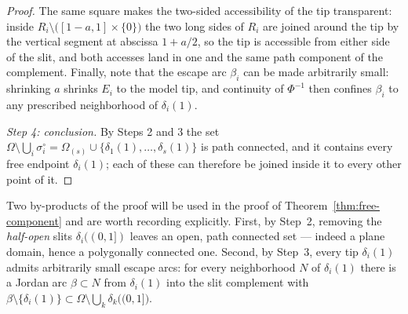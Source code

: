 \begin{proof}
The same square makes the two-sided accessibility of the tip transparent: inside
$R_i\setminus\bigl([1-a,1]\times\{0\}\bigr)$ the two long sides of $R_i$ are joined
around the tip by the vertical segment at abscissa $1+a/2$, so the tip is accessible
from either side of the slit, and both accesses land in one and the same path component
of the complement. Finally, note that the escape arc $\beta_i$ can be made arbitrarily
small: shrinking $a$ shrinks $E_i$ to the model tip, and continuity of $\Phi^{-1}$ then
confines $\beta_i$ to any prescribed neighborhood of $\delta_i(1)$.

\emph{Step 4: conclusion.}
By Steps 2 and 3 the set
$\Omega\setminus\bigcup_i\sigma_i^{\circ}=\Omega_{(s)}\cup\{\delta_1(1),\dots,
\delta_s(1)\}$ is path connected, and it contains every free endpoint $\delta_i(1)$;
each of these can therefore be joined inside it to every other point of it.
\end{proof}

Two by-products of the proof will be used in the proof of
Theorem~\ref{thm:free-component} and are worth recording explicitly. First, by Step~2,
removing the \emph{half-open} slits $\delta_i((0,1])$ leaves an open, path connected
set --- indeed a plane domain, hence a polygonally connected one. Second, by Step~3,
every tip $\delta_i(1)$ admits arbitrarily small escape arcs: for every neighborhood $N$
of $\delta_i(1)$ there is a Jordan arc $\beta\subset N$ from $\delta_i(1)$ into the slit
complement with $\beta\setminus\{\delta_i(1)\}\subset
\Omega\setminus\bigcup_k\delta_k\bigl((0,1]\bigr)$.

